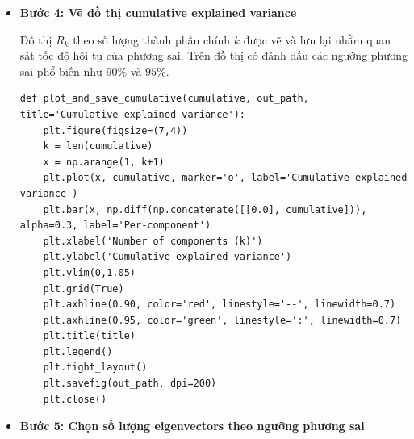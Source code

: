 \begin{itemize}
                    Phương sai trên từng thành phần chính được tính từ ma trận $Z$:
                    \begin{align}
                        \sigma_k^2 = \mathrm{Var}(Z_k)
                    \end{align}
                    Tổng phương sai của dữ liệu gốc:
                    \begin{align}
                        \sigma_{\text{total}}^2 = \sum_{j=1}^{W} \mathrm{Var}(X_j)
                    \end{align}
                    Tỉ lệ phương sai được giải thích bởi từng thành phần chính:
                    \begin{align}
                        r_k = \frac{\sigma_k^2}{\sigma_{\text{total}}^2}
                    \end{align}
                    Phương sai tích luỹ:
                    \begin{align}
                        R_k = \sum_{i=1}^{k} r_i
                    \end{align}
                    \begin{lstlisting}
variances = np.var(Z, axis=0, ddof=1)
total_var = np.sum(np.var(X, axis=0, ddof=1))

if total_var <= 0:
    explained = np.zeros_like(variances)
else:
    explained = variances / total_var
cumulative = np.cumsum(explained)
                    \end{lstlisting}
                \item \textbf{Bước 4: Vẽ đồ thị cumulative explained variance}

                    Đồ thị $R_k$ theo số lượng thành phần chính $k$ được vẽ và lưu lại nhằm quan sát tốc độ hội tụ của phương sai.
                    Trên đồ thị có đánh dấu các ngưỡng phương sai phổ biến như $90\%$ và $95\%$.
                    \begin{lstlisting}
def plot_and_save_cumulative(cumulative, out_path, title='Cumulative explained variance'):
    plt.figure(figsize=(7,4))
    k = len(cumulative)
    x = np.arange(1, k+1)
    plt.plot(x, cumulative, marker='o', label='Cumulative explained variance')
    plt.bar(x, np.diff(np.concatenate([[0.0], cumulative])), alpha=0.3, label='Per-component')
    plt.xlabel('Number of components (k)')
    plt.ylabel('Cumulative explained variance')
    plt.ylim(0,1.05)
    plt.grid(True)
    plt.axhline(0.90, color='red', linestyle='--', linewidth=0.7)
    plt.axhline(0.95, color='green', linestyle=':', linewidth=0.7)
    plt.title(title)
    plt.legend()
    plt.tight_layout()
    plt.savefig(out_path, dpi=200)
    plt.close()
                    \end{lstlisting}
                \item \textbf{Bước 5: Chọn số lượng eigenvectors theo ngưỡng phương sai}


\end{itemize}
